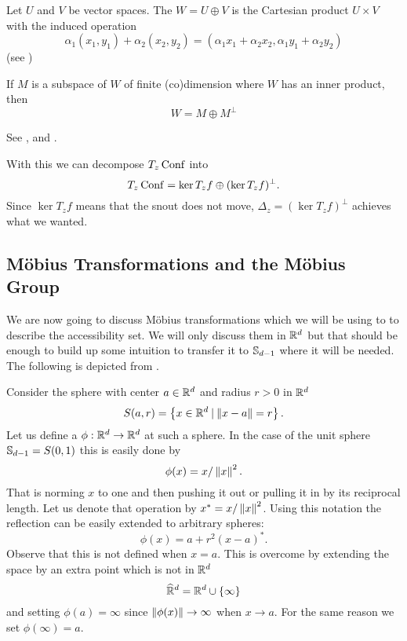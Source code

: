 \begin{definition}
    Let $U$ and $V$ be vector spaces. The 
    $W = U \oplus V$ is the Cartesian product $U \times V$
    with the induced operation
    \[ \alpha_1 (x_1,y_1) + \alpha_2 (x_2,y_2)
        = (\alpha_1 x_1 + \alpha_2 x_2, \alpha_1 y_1 + \alpha_2 y_2) \]
    (see \cite[§18]{Halmos})
\end{definition}

\begin{theorem}
    If $M$ is a subspace of $W$ of finite (co)dimension where $W$ has an
    inner product, then
    \[ W = M \oplus M^{\perp} \]
    
    See \cite[§66]{Halmos}, \cite[p.22]{Rodriguez07} and \cite[p.121]{Treves}.
\end{theorem}


With this we can decompose $T_z\operatorname{Conf}$ into
    \[ T_z\operatorname{Conf} = \ker T_zf \oplus (\ker T_zf)^{\perp} .\]
Since $\ker T_zf$ means that the snout does not move, $\Delta_z = (\ker T_zf)^{\perp}$
achieves what we wanted.



\subsection{Möbius Transformations and the Möbius Group}
We are now going to discuss Möbius transformations which we will be using to to
describe the accessibility set. We will only discuss them in $\mathbb{R}^d$ but that should
be enough to build up some intuition to transfer it to $\mathbb{S}_{d-1}$ where it will be
needed. The following is depicted from \cite[p. 20ff]{Beardon}.

Consider the sphere with center $a \in \mathbb{R}^d$ and radius $r > 0$ in $\mathbb{R}^d$
    \[ S(a,r) = \left\{{x \in \mathbb{R}^d} \:|\: {\left\Vert{x - a}\right\Vert = r}\right\} . \]
Let us define a  $\phi : \mathbb{R}^d \rightarrow \mathbb{R}^d$ at such a sphere.
In the case of the unit sphere $\mathbb{S}_{d-1} = S(0,1)$ this is easily done by
    \[ \phi(x) = x/\left\Vert{x}\right\Vert^2 . \]
That is norming $x$ to one and then pushing it out or pulling it in \resp by its
reciprocal length. Let us denote that operation by $x^* = x/\left\Vert{x}\right\Vert^2$.
Using this notation the reflection can be easily extended to arbitrary spheres:
    \[ \phi(x) = a + r^2(x - a)^* . \]
Observe that this is not defined when $x = a$. This is overcome by extending
the space by an extra point which is not in $\mathbb{R}^d$
    \[ \widehat{\mathbb{R}}^d = \mathbb{R}^d \cup \{\infty\} \]
and setting $\phi(a) = \infty$ since $\left\Vert{\phi(x)}\right\Vert \rightarrow \infty$ when
$x \rightarrow a$. For the same reason we set $\phi(\infty) = a$.

